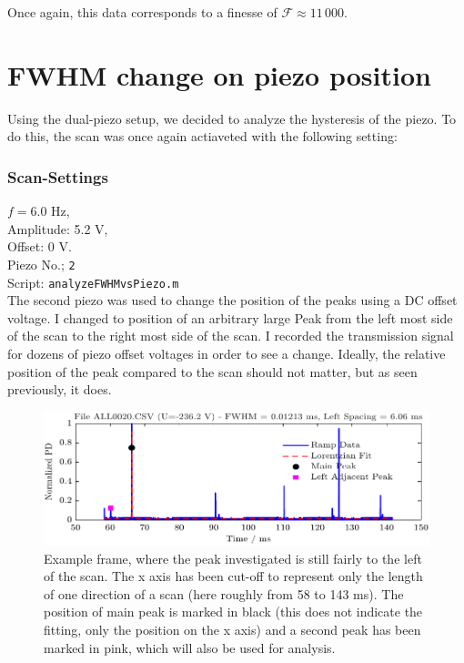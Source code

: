 \documentclass[a4paper,11pt]{article}
\begin{document}
Once again, this data corresponds to a finesse of $\mathcal{F}\approx11\,000$.




\newpage
\section{FWHM change on piezo position}
Using the dual-piezo setup, we decided to analyze the hysteresis of the piezo. To do this, the scan was once again actiaveted with the following setting:
\subsubsection*{Scan-Settings}
$f = 6.0$ Hz,  \\
Amplitude: 5.2 V,  \\
Offset: 0 V.  \\
Piezo No.; \texttt{2}  \\
Script: \texttt{analyzeFWHMvsPiezo.m} \\

The second piezo was used to change the position of the peaks using a DC offset voltage.
I changed to position of an arbitrary large Peak from the left most side of the scan to the right most side of the scan. I recorded the transmission signal for dozens of piezo offset voltages in order to see a change. Ideally, the relative position of the peak compared to the scan should not matter, but as seen previously, it does. 


\begin{figure}[H]
    \centering
    \includegraphics[width=\textwidth]{fwhm/Figure_1.pdf}
    \caption{Example frame, where the peak investigated is still fairly to the left of the scan. The x axis has been cut-off to represent only the length of one direction of a scan (here roughly from 58 to 143 ms). The position of main peak is marked in black (this does not indicate the fitting, only the position on the x axis) and a second peak has been marked in pink, which will also be used for analysis.}
\end{figure}
\end{document}
